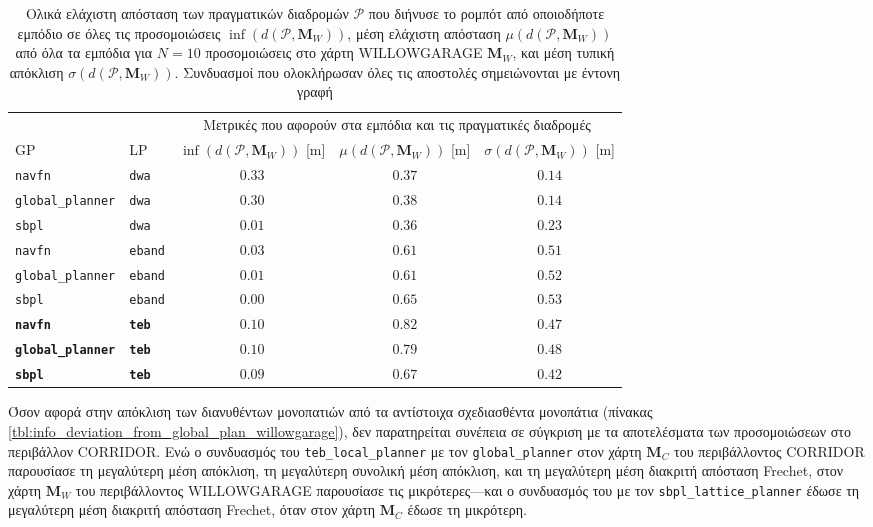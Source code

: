 \begin{table}[h]
\renewcommand{\arraystretch}{1.3}
\begin{tabular}{llccc}
  & & \multicolumn{3}{c}{Μετρικές που αφορούν στα εμπόδια και τις πραγματικές διαδρομές} \\
  \cline{3-5}
  GP & LP & $\inf(d(\bm{\mathcal{P}},\bm{M}_W))$ [m] & $\mu(d(\bm{\mathcal{P}},\bm{M}_W))$ [m] & $\sigma(d(\bm{\mathcal{P}},\bm{M}_W))$ [m] \\ \toprule
  \texttt{navfn} & \texttt{dwa} & $0.33$ & $0.37$ & $0.14$ \\
  \texttt{global\_planner} & \texttt{dwa} & $0.30$ & $0.38$ & $0.14$ \\
  \texttt{sbpl} & \texttt{dwa} & $0.01$ & $0.36$ & $0.23$ \\
  \texttt{navfn} & \texttt{eband} & $0.03$ & $0.61$ & $0.51$ \\
  \texttt{global\_planner} & \texttt{eband} & $0.01$ & $0.61$ & $0.52$ \\
  \texttt{sbpl} & \texttt{eband} & $0.00$ & $0.65$ & $0.53$ \\
  \textbf{\texttt{navfn}} & \textbf{\texttt{teb}} & $\bm{0.10}$ & $\bm{0.82}$ & $\bm{0.47}$ \\
  \textbf{\texttt{global\_planner}} & \textbf{\texttt{teb}} & $\bm{0.10}$ & $\bm{0.79}$ & $\bm{0.48}$ \\
  \textbf{\texttt{sbpl}} & \textbf{\texttt{teb}} & $\bm{0.09}$ & $\bm{0.67}$ & $\bm{0.42}$ \\ \bottomrule
\end{tabular}
\caption{\small Ολικά ελάχιστη απόσταση των πραγματικών διαδρομών
         $\bm{\mathcal{P}}$ που διήνυσε το ρομπότ από οποιοδήποτε εμπόδιο σε
         όλες τις προσομοιώσεις $\inf(d(\bm{\mathcal{P}},\bm{M}_W))$, μέση
         ελάχιστη απόσταση $\mu(d(\bm{\mathcal{P}},\bm{M}_W))$ από όλα τα
         εμπόδια για $N=10$ προσομοιώσεις στο χάρτη WILLOWGARAGE $\bm{M}_W$, και μέση τυπική απόκλιση
         $\sigma(d(\bm{\mathcal{P}},\bm{M}_W))$. Συνδυασμοί που
         ολοκλήρωσαν όλες τις αποστολές σημειώνονται με έντονη γραφή}
\label{tbl:info_ground_truth_map_willowgarage}
\end{table}

Όσον αφορά στην απόκλιση των διανυθέντων μονοπατιών από τα αντίστοιχα
σχεδιασθέντα μονοπάτια (πίνακας
\ref{tbl:info_deviation_from_global_plan_willowgarage}), δεν παρατηρείται
συνέπεια σε σύγκριση με τα αποτελέσματα των προσομοιώσεων στο περιβάλλον
CORRIDOR. Ενώ ο συνδυασμός του \texttt{teb\_local\_planner} με τον
\texttt{global\_planner}  στον χάρτη $\bm{M}_C$ του περιβάλλοντος CORRIDOR
παρουσίασε τη μεγαλύτερη μέση απόκλιση, τη μεγαλύτερη συνολική μέση απόκλιση,
και τη μεγαλύτερη μέση διακριτή απόσταση Frechet, στον χάρτη $\bm{M}_W$ του
περιβάλλοντος WILLOWGARAGE παρουσίασε τις μικρότερες---και ο συνδυασμός του με
τον \texttt{sbpl\_lattice\_planner} έδωσε τη μεγαλύτερη μέση διακριτή απόσταση
Frechet, όταν στον χάρτη $\bm{M}_C$ έδωσε τη μικρότερη.

